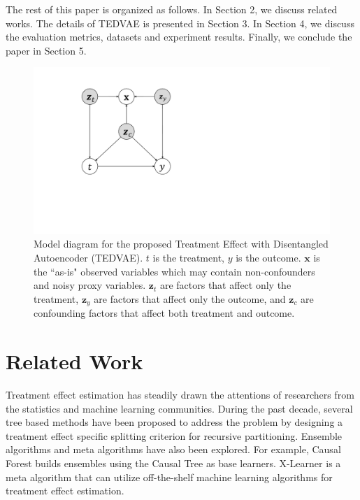 \documentclass[letterpaper]{article} %
\begin{document}
The rest of this paper is organized as follows. In Section 2, we discuss related works. The details of TEDVAE is presented in Section 3. In Section 4, we discuss the evaluation metrics, datasets and experiment results. Finally, we conclude the paper in Section 5. 


\begin{figure}[!t]
	\centering
	\includegraphics[width = 0.9\columnwidth]{figures.pdf}
	\caption{Model diagram for the proposed Treatment Effect with Disentangled Autoencoder (TEDVAE). $t$ is the treatment, $y$ is the outcome. $\mathbf{x}$ is the ``as-is" observed variables which may contain non-confounders and noisy proxy variables. 
		$\mathbf{z}_t$ are factors that affect only the treatment, $\mathbf{z}_y$ are factors that affect only the outcome, and $\mathbf{z}_c$ are confounding factors that affect both treatment and outcome. 
	}
	\label{illustration}
\end{figure}
\section*{Related Work}
Treatment effect estimation has steadily drawn the attentions of researchers from the statistics and machine learning communities. During the past decade,  
several tree based methods \cite {Su2009,Athey2015,Zhang2017,Zhang2018} have been proposed to address the problem by designing a treatment effect specific splitting criterion for recursive partitioning. 
Ensemble algorithms and meta algorithms \cite{Kuenzel2019,Wager2018} have also been explored. For example, Causal Forest\cite{Wager2018} builds ensembles using the Causal Tree \cite{Athey2015} as base learners. X-Learner \cite{Kuenzel2019} is a meta algorithm that can utilize off-the-shelf machine learning algorithms for treatment effect estimation. 
\end{document}

